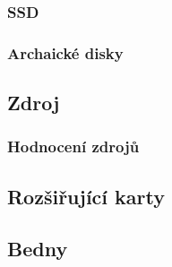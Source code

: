 \documentclass[a4paper]{article}
\begin{document}
        \subsubsection{SSD}
        \subsubsection{Archaické disky}
    \subsection{Zdroj}
        \subsubsection{Hodnocení zdrojů}
    \subsection{Rozšiřující karty}
    \subsection{Bedny}

\newpage
\end{document}
